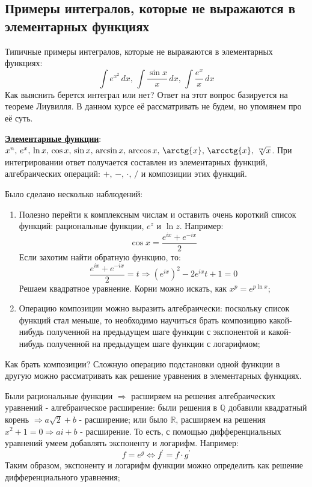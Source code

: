 \documentclass[12pt]{article}
\newcommand{\MR}{\mathbb{R}}
\newcommand{\MQ}{\mathbb{Q}}
\newcommand{\dx}{\, dx}
\theoremstyle{definition}
\DeclareMathOperator{\dint}{\displaystyle\int}
\begin{document}
\subsection*{Примеры интегралов, которые не выражаются в элементарных функциях}
Типичные примеры интегралов, которые не выражаются в элементарных функциях: 
$$\dint e^{x^2}\dx, \, \dint \dfrac{\sin{x}}{x}\dx, \, \dint \dfrac{e^x}{x}\dx$$
Как выяснить берется интеграл или нет? Ответ на этот вопрос базируется на теореме Лиувилля. В данном курсе её рассматривать не будем, но упомянем про её суть.

\textbf{\uline{Элементарные функции}}: $x^n, \, e^x, \, \ln{x}, \, \cos{x}, \, \sin{x}, \, \arcsin{x}, \, \arccos{x}, \, \arctg{x}, \, \arcctg{x}, \, \sqrt[m]{x}$. При интегрировании ответ получается составлен из элементарных функций, алгебраических операций: $+,\, -,\, \cdot,\, / $ и композиции этих функций.

Было сделано несколько наблюдений:
\begin{enumerate}[label={(\arabic*)}]
	\item Полезно перейти к комплексным числам и оставить очень короткий список функций: рациональные функции, $e^z$ и $\ln{z}$. Например: 
	$$
		\cos{x} = \dfrac{e^{ix} + e^{-ix}}{2}
	$$ 
	Если захотим найти обратную функцию, то: 
	$$
		\dfrac{e^{ix} + e^{-ix}}{2} = t \Rightarrow (e^{ix})^2 - 2 e^{ix}t + 1 = 0 
	$$ 
	Решаем квадратное уравнение. Корни можно искать, как $x^p = e^{p\ln{x}}$;
	\item Операцию композиции можно выразить алгебраически: поскольку список функций стал меньше, то необходимо научиться брать композицию какой-нибудь полученной на предыдущем шаге функции с экспонентой и какой-нибудь полученной на предыдущем шаге функции с  логарифмом;
\end{enumerate}

Как брать композиции? Сложную операцию подстановки одной функции в другую можно рассматривать как решение уравнения в элементарных функциях. 

Были рациональные функции $\Rightarrow$ расширяем на решения алгебраических уравнений - алгебраическое расширение: были решения в $\MQ$ добавили квадратный корень $\Rightarrow a\sqrt{2} + b$ - расширение; или было $\MR$, расширяем на решения $x^2 + 1 = 0 \Rightarrow ai + b$ - расширение. То есть, с помощью дифференциальных уравнений умеем добавлять экспоненту и логарифм. Например: 
$$
	f = e^g \Leftrightarrow f^\prime = f{\cdot}g^\prime
$$
Таким образом, экспоненту и логарифм функции можно определить как решение дифференциального уравнения;
\end{document}
